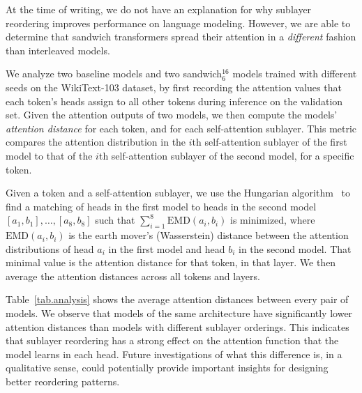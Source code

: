 \documentclass[11pt,a4paper]{article}
\begin{document}
At the time of writing, we do not have an explanation for why sublayer reordering improves performance on language modeling.
However, we are able to determine that sandwich transformers spread their attention in a \emph{different} fashion than interleaved models.


We analyze two baseline models and two sandwich$^{16}_6$ models trained with different seeds on the WikiText-103 dataset, by first recording the attention values that each token's heads assign to all other tokens during inference on the validation set. 
Given the attention outputs of two models, we then compute the models' \emph{attention distance} for each token, and for each self-attention sublayer. This metric compares the attention distribution in the $i$th self-attention sublayer of the first model to that of the $i$th self-attention sublayer of the second model, for a specific token. 

Given a token and a self-attention sublayer, we use the Hungarian algorithm~\cite{kuhn1955hungarian} to find a matching of heads in the first model to heads in the second model $[a_1, b_1], \dots, [a_8, b_8]$ such that $\sum_{i=1}^8 \text{EMD}(a_i, b_i)$ is minimized, where $\text{EMD}(a_i, b_i)$ is the earth mover's (Wasserstein) distance between the attention distributions of head $a_i$ in the first model and head $b_i$ in the second model. That minimal value is the attention distance for that token, in that layer.
We then average the attention distances across all tokens and layers. 
 


Table~\ref{tab.analysis} shows the average attention distances between every pair of models. We observe that models of the same architecture have significantly lower attention distances than models with different sublayer orderings.
This indicates that sublayer reordering has a strong effect on the attention function that the model learns in each head.
Future investigations of what this difference is, in a qualitative sense, could potentially provide important insights for designing better reordering patterns.
\end{document}
